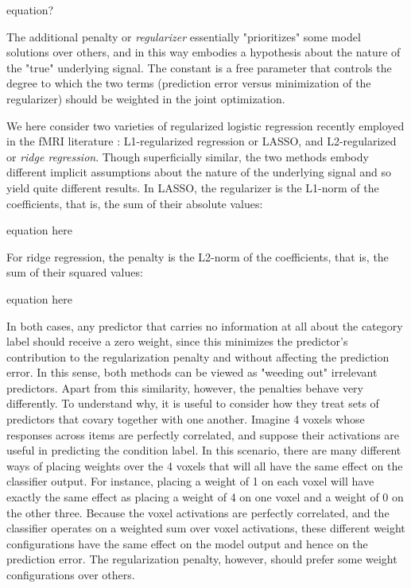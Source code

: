 {\orange equation?} 

The additional penalty or {\em regularizer} essentially "prioritizes" some model solutions over others, and in this way embodies a hypothesis about the nature of the "true" underlying signal. The constant \lambda is a free parameter that controls the degree to which the two terms (prediction error versus minimization of the regularizer) should be weighted in the joint optimization.

We here consider two varieties of regularized logistic regression recently employed in the fMRI literature \cite{XX}: L1-regularized regression or LASSO, and L2-regularized or {\em ridge regression}. Though superficially similar, the two methods embody different implicit assumptions about the nature of the underlying signal and so yield quite different results. In LASSO, the regularizer is the L1-norm of the coefficients, that is, the sum of their absolute values:

{\orange equation here}

For ridge regression, the penalty is the L2-norm of the coefficients, that is, the sum of their squared values:

{\orange equation here}

In both cases, any predictor that carries no information at all about the category label should receive a zero weight, since this minimizes the predictor's contribution to the regularization penalty and without affecting the prediction error. In this sense, both methods can be viewed as "weeding out" irrelevant predictors. Apart from this similarity, however, the penalties behave very differently. To understand why, it is useful to consider how they treat sets of predictors that covary together with one another. Imagine 4 voxels whose responses across items are perfectly correlated, and suppose their activations are useful in predicting the condition label. In this scenario, there are many different ways of placing weights over the 4 voxels that will all have the same effect on the classifier output. For instance, placing a weight of 1 on each voxel will have exactly the same effect as placing a weight of 4 on one voxel and a weight of 0 on the other three. Because the voxel activations are perfectly correlated, and the classifier operates on a weighted sum over voxel activations, these different weight configurations have the same effect on the model output and hence on the prediction error. The regularization penalty, however, should prefer some weight configurations over others.

